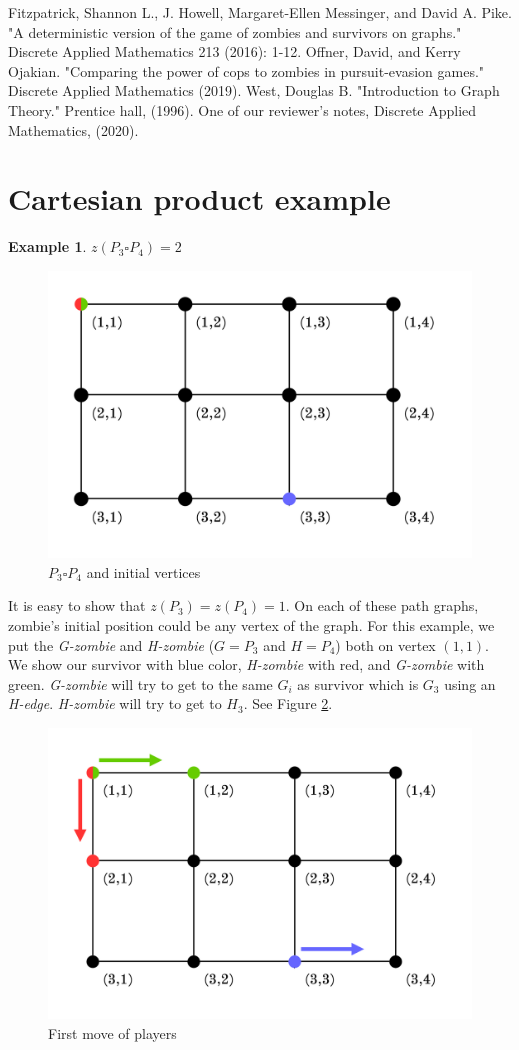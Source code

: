 \documentclass[1p]{elsarticle}
\newtheorem{example}[theorem]{Example}
\begin{document}
\begin{thebibliography}{999}
	
	Fitzpatrick, Shannon L., J. Howell, Margaret-Ellen Messinger, and David A. Pike. "A deterministic version of the
	game of zombies and survivors on graphs." Discrete Applied Mathematics 213 (2016): 1-12.
	Offner, David, and Kerry Ojakian. "Comparing the power of cops to zombies in pursuit-evasion games." Discrete
	Applied Mathematics (2019).
	West, Douglas B. "Introduction to Graph Theory." Prentice hall, (1996).
	One of our reviewer's notes, Discrete Applied Mathematics, (2020).
\end{thebibliography}

\appendix
\section{Cartesian product example} \label{cartesianProductExample}
\begin{example} $z(P_3 \square P_4 ) = 2$
\end{example}

\begin{figure}[h!]
	\centering
	\includegraphics[width=0.5\linewidth]{fig/p34m1.png}
	\caption{$P_3 \square P_4$ and initial vertices}
	\label{fig:p3}
\end{figure}

It is easy to show that $z(P_3) = z(P_4) = 1$. On each of these path graphs, zombie's initial position could be any
vertex of the graph. For this example, we put the {\it G-zombie} and {\it H-zombie} ($G = P_3$ and $H = P_4$) both on
vertex $(1,1)$. We show our survivor with blue color, {\it H-zombie} with red, and {\it G-zombie} with green. {\it
G-zombie} will try to get to the same $G_{i}$ as survivor which is $G_3$ using an {\it H-edge}. {\it H-zombie} will try
to get to $H_3$. See Figure \ref{fig:p4}.

\begin{figure}[h!]
	\centering
	\includegraphics[width=0.5\linewidth]{fig/p34m2.png}
	\caption{First move of players}
	\label{fig:p4}
\end{figure}
\end{document}
